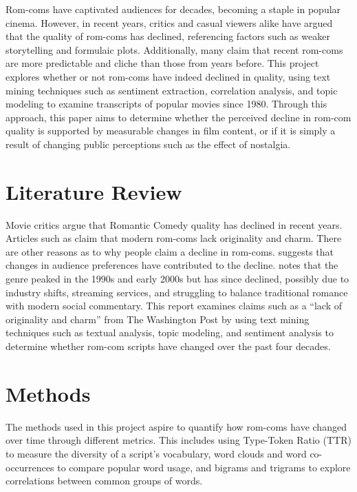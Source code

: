 \documentclass[
  authoryear,
  preprint]{elsarticle}
\begin{document}
Rom-coms have captivated audiences for decades, becoming a staple in
popular cinema. However, in recent years, critics and casual viewers
alike have argued that the quality of rom-coms has declined, referencing
factors such as weaker storytelling and formulaic plots. Additionally,
many claim that recent rom-coms are more predictable and cliche than
those from years before. This project explores whether or not rom-coms
have indeed declined in quality, using text mining techniques such as
sentiment extraction, correlation analysis, and topic modeling to
examine transcripts of popular movies since 1980. Through this approach,
this paper aims to determine whether the perceived decline in rom-com
quality is supported by measurable changes in film content, or if it is
simply a result of changing public perceptions such as the effect of
nostalgia.

\section{Literature Review}\label{literature-review}

Movie critics argue that Romantic Comedy quality has declined in recent
years. Articles such as \citet{romcomdead} claim that modern rom-coms
lack originality and charm. There are other reasons as to why people
claim a decline in rom-coms. \citet{romcombad} suggests that changes in
audience preferences have contributed to the decline.
\citet{downfallromcom} notes that the genre peaked in the 1990s and
early 2000s but has since declined, possibly due to industry shifts,
streaming services, and struggling to balance traditional romance with
modern social commentary. This report examines claims such as a ``lack
of originality and charm'' from The Washington Post by using text mining
techniques such as textual analysis, topic modeling, and sentiment
analysis to determine whether rom-com scripts have changed over the past
four decades.

\section{Methods}\label{methods}

The methods used in this project aspire to quantify how rom-coms have
changed over time through different metrics. This includes using
Type-Token Ratio (TTR) to measure the diversity of a script's
vocabulary, word clouds and word co-occurrences to compare popular word
usage, and bigrams and trigrams to explore correlations between common
groups of words.
\end{document}

